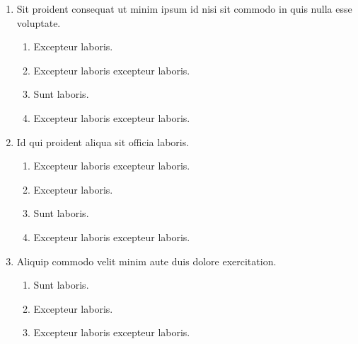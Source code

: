 \documentclass[a4paper,12pt]{article}
\begin{document}
\begin{enumerate}[label=\textbf{\arabic*.}]
\begin{multicols}{2}
\begin{enumerate}
		\item  Excepteur laboris.
    
		\item  Sunt laboris.
    
	\end{enumerate}

\end{multicols}
\item Sit proident consequat ut minim ipsum id nisi sit commodo in quis nulla esse voluptate.
\begin{multicols}{2}
	\begin{enumerate}
		\item  Excepteur laboris.
    
		\item  Excepteur laboris excepteur laboris.
  
		\item  Sunt laboris.
    
		\item  Excepteur laboris excepteur laboris.
    
	\end{enumerate}

\end{multicols}
\item Id qui proident aliqua sit officia laboris.
\begin{multicols}{2}
	\begin{enumerate}
		\item  Excepteur laboris excepteur laboris.
  
		\item  Excepteur laboris.
    
		\item  Sunt laboris.
    
		\item  Excepteur laboris excepteur laboris.
    
	\end{enumerate}

\end{multicols}
\item Aliquip commodo velit minim aute duis dolore exercitation.
\begin{multicols}{2}
	\begin{enumerate}
		\item  Sunt laboris.
    
		\item  Excepteur laboris.
    
		\item  Excepteur laboris excepteur laboris.
    

\end{enumerate}
\end{multicols}
\end{enumerate}
\end{document}
